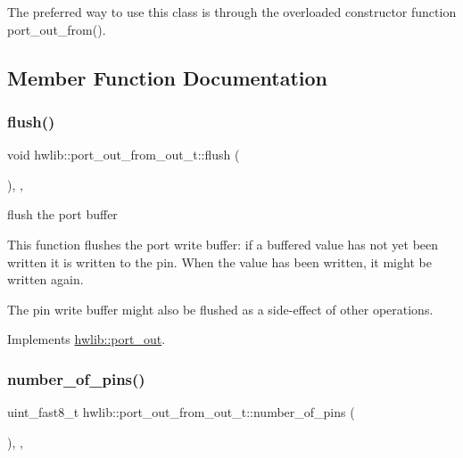 The preferred way to use this class is through the overloaded constructor function port\+\_\+out\+\_\+from(). 

\subsection{Member Function Documentation}
\mbox{\label{classhwlib_1_1port__out__from__out__t_ab9caf29db8ef90afa7dfd645fd4f89f0}} 
\subsubsection{\texorpdfstring{flush()}{flush()}}
{\footnotesize\ttfamily void hwlib\+::port\+\_\+out\+\_\+from\+\_\+out\+\_\+t\+::flush (\begin{DoxyParamCaption}{ }\end{DoxyParamCaption})\hspace{0.3cm}{\ttfamily [inline]}, {\ttfamily [override]}, {\ttfamily [virtual]}}





flush the port buffer

This function flushes the port write buffer\+: if a buffered value has not yet been written it is written to the pin. When the value has been written, it might be written again.

The pin write buffer might also be flushed as a side-\/effect of other operations. 

Implements \hyperlink{classhwlib_1_1port__out_aff7c8d768ec0b7f3d738a47ef1a4bbfe}{hwlib\+::port\+\_\+out}.

\mbox{\label{classhwlib_1_1port__out__from__out__t_a6e8205f2537103897083612c6d5f35a9}} 
\subsubsection{\texorpdfstring{number\+\_\+of\+\_\+pins()}{number\_of\_pins()}}
{\footnotesize\ttfamily uint\+\_\+fast8\+\_\+t hwlib\+::port\+\_\+out\+\_\+from\+\_\+out\+\_\+t\+::number\+\_\+of\+\_\+pins (\begin{DoxyParamCaption}{ }\end{DoxyParamCaption})\hspace{0.3cm}{\ttfamily [inline]}, {\ttfamily [override]}, {\ttfamily [virtual]}}





